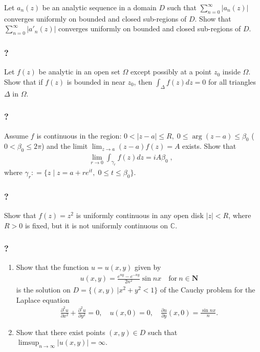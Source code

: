 Let \(a_n(z)\) be an analytic sequence in a domain \(D\) such that
\(\displaystyle \sum_{n=0}^\infty |a_n(z)|\) converges uniformly on
bounded and closed sub-regions of \(D\). Show that
\(\displaystyle \sum_{n=0}^\infty |a'_n(z)|\) converges uniformly on
bounded and closed sub-regions of \(D\).

\hypertarget{section-98}{%
\subsubsection{?}\label{section-98}}

Let \(f(z)\) be analytic in an open set \(\Omega\) except possibly at a
point \(z_0\) inside \(\Omega\). Show that if \(f(z)\) is bounded in
near \(z_0\), then \(\displaystyle \int_\Delta f(z) dz = 0\) for all
triangles \(\Delta\) in \(\Omega\).

\hypertarget{section-99}{%
\subsubsection{?}\label{section-99}}

Assume \(f\) is continuous in the region:
\(0< |z-a| \leq R, \; 0 \leq \arg(z-a) \leq \beta_0\)
(\(0 < \beta_0 \leq 2 \pi\)) and the limit
\(\displaystyle \lim_{z \rightarrow a} (z-a) f(z) = A\) exists. Show
that
\begin{align*}\lim_{r \rightarrow 0} \int_{\gamma_r} f(z) dz  = i A \beta_0 \; , \; \;\end{align*}
where
\(\gamma_r : = \{ z \; | \; z = a + r e^{it}, \; 0 \leq t \leq \beta_0 \}.\)

\hypertarget{section-100}{%
\subsubsection{?}\label{section-100}}

Show that \(f(z) = z^2\) is uniformly continuous in any open disk
\(|z| < R\), where \(R>0\) is fixed, but it is not uniformly continuous
on \(\mathbb C\).

\hypertarget{section-101}{%
\subsubsection{?}\label{section-101}}

\begin{enumerate}
\def\labelenumi{(\arabic{enumi})}
\tightlist
\item
  Show that the function \(u=u(x,y)\) given by
  \begin{align*}u(x,y)=\frac{e^{ny}-e^{-ny}}{2n^2}\sin nx\quad \text{for}\ n\in {\mathbf N}\end{align*}
  is the solution on \(D=\{(x,y)\ | x^2+y^2<1\}\) of the Cauchy problem
  for the Laplace equation
  \begin{align*}\frac{\partial ^2u}{\partial x^2}+\frac{\partial ^2u}{\partial y^2}=0,\quad
  u(x,0)=0,\quad \frac{\partial u}{\partial y}(x,0)=\frac{\sin nx}{n}.\end{align*}
\item
  Show that there exist points \((x,y)\in D\) such that
  \(\displaystyle{\limsup_{n\to\infty} |u(x,y)|=\infty}\).
\end{enumerate}

